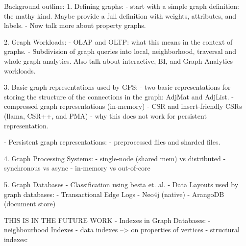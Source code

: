 
Background outline:
1. Defining graphs:
  - start with a simple graph definition: the mathy kind. Maybe provide a full definition with weights, attributes, and labels.
  - Now talk more about property graphs.

2. Graph Workloads:
  - OLAP and OLTP: what this means in the context of graphs. 
  - Subdivision of graph queries into local, neighborhood, traversal and whole-graph analytics. Also talk about interactive, BI, and Graph Analytics workloads. 

3. Basic graph representations used by GPS:
  - two basic representations for storing the structure of the connections in the graph: AdjMat and AdjList.
  - compressed graph representations (in-memory)
    - CSR and insert-friendly CSRs (llama, CSR++, and PMA)
    - why this does not work for persistent representation.

  - Persistent graph representations:
    - preprocessed files and sharded files.

4. Graph Processing Systems:
  - single-node (shared mem) vs distributed
  - synchronous vs async
  - in-memory vs out-of-core

5. Graph Databases
  - Classification using besta et. al.
  - Data Layouts used by graph databases:
    - Transactional Edge Logs
    - Neo4j (native)
    - ArangoDB (document store)

  



THIS IS IN THE FUTURE WORK
  - Indexes in Graph Databases:
    - neighbourhood Indexes
    - data indexes --> on properties of vertices
    - structural indexes: 